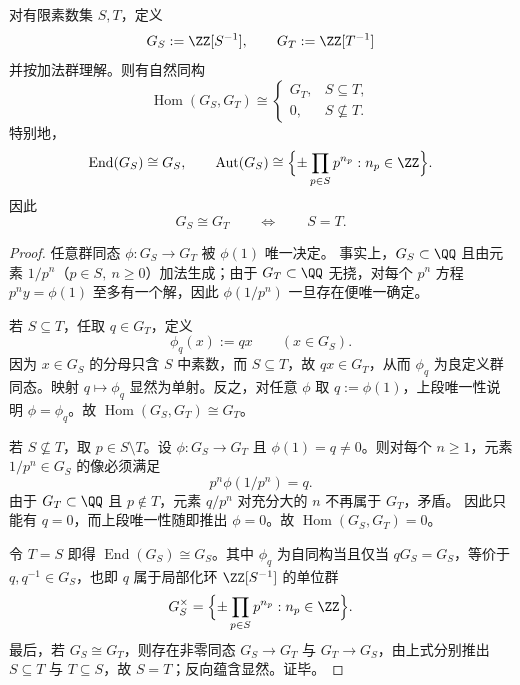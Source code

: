 \begin{theorem}\label{thm:xi-cdim-localization-hom-category-classification}
对有限素数集 \(S,T\)，定义
\[
G_S:=\ZZ[S^{-1}],
\qquad
G_T:=\ZZ[T^{-1}]
\]
并按加法群理解。则有自然同构
\[
\operatorname{Hom}(G_S,G_T)\cong
\begin{cases}
G_T,& S\subseteq T,\\[2mm]
0,& S\not\subseteq T.
\end{cases}
\]
特别地，
\[
\operatorname{End}(G_S)\cong G_S,
\qquad
\operatorname{Aut}(G_S)\cong
\Bigl\{\pm\prod_{p\in S}p^{n_p}:n_p\in\ZZ\Bigr\}.
\]
因此
\[
G_S\cong G_T
\qquad\Longleftrightarrow\qquad
S=T.
\]
\end{theorem}
\begin{proof}
任意群同态 \(\phi:G_S\to G_T\) 被 \(\phi(1)\) 唯一决定。
事实上，\(G_S\subset\QQ\) 且由元素 \(1/p^n\)（\(p\in S,\ n\ge 0\)）加法生成；由于 \(G_T\subset\QQ\) 无挠，对每个 \(p^n\) 方程
\(
p^n y=\phi(1)
\)
至多有一个解，因此 \(\phi(1/p^n)\) 一旦存在便唯一确定。

若 \(S\subseteq T\)，任取 \(q\in G_T\)，定义
\[
\phi_q(x):=qx\qquad (x\in G_S).
\]
因为 \(x\in G_S\) 的分母只含 \(S\) 中素数，而 \(S\subseteq T\)，故 \(qx\in G_T\)，从而 \(\phi_q\) 为良定义群同态。映射
\(
q\mapsto \phi_q
\)
显然为单射。反之，对任意 \(\phi\) 取 \(q:=\phi(1)\)，上段唯一性说明 \(\phi=\phi_q\)。故 \(\operatorname{Hom}(G_S,G_T)\cong G_T\)。

若 \(S\not\subseteq T\)，取 \(p\in S\setminus T\)。设 \(\phi:G_S\to G_T\) 且 \(\phi(1)=q\neq 0\)。则对每个 \(n\ge 1\)，元素 \(1/p^n\in G_S\) 的像必须满足
\[
p^n\phi(1/p^n)=q.
\]
由于 \(G_T\subset\QQ\) 且 \(p\notin T\)，元素 \(q/p^n\) 对充分大的 \(n\) 不再属于 \(G_T\)，矛盾。
因此只能有 \(q=0\)，而上段唯一性随即推出 \(\phi=0\)。故 \(\operatorname{Hom}(G_S,G_T)=0\)。

令 \(T=S\) 即得 \(\operatorname{End}(G_S)\cong G_S\)。其中 \(\phi_q\) 为自同构当且仅当 \(qG_S=G_S\)，等价于 \(q,q^{-1}\in G_S\)，也即 \(q\) 属于局部化环 \(\ZZ[S^{-1}]\) 的单位群
\[
G_S^\times=
\Bigl\{\pm\prod_{p\in S}p^{n_p}:n_p\in\ZZ\Bigr\}.
\]
最后，若 \(G_S\cong G_T\)，则存在非零同态 \(G_S\to G_T\) 与 \(G_T\to G_S\)，由上式分别推出 \(S\subseteq T\) 与 \(T\subseteq S\)，故 \(S=T\)；反向蕴含显然。证毕。
\end{proof}

